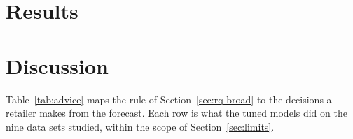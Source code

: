 \section{Results}
\label{sec:results}



\ifjournal\else


\fi

\section{Discussion}
\label{sec:discussion}

Table~\ref{tab:advice} maps the rule of Section~\ref{sec:rq-broad} to the
decisions a retailer makes from the forecast. Each row is what the tuned models
did on the nine data sets studied, within the scope of
Section~\ref{sec:limits}.

